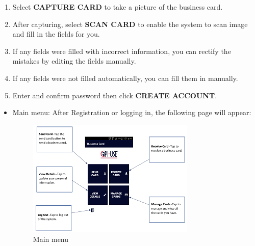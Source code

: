 \documentclass[english]{article}
\begin{document}
\begin{itemize}
\begin{enumerate}
			\item Select \textbf{CAPTURE CARD} to take a picture of the business card.
			\item After capturing, select \textbf{SCAN CARD} to enable the system to scan image and fill in the fields for you.
			\item If any fields were filled with incorrect information, you can rectify the mistakes by editing the fields manually.
			\item If any fields were not filled automatically, you can fill them in manually.
			\item Enter and confirm password then click \textbf{CREATE ACCOUNT}.
		\end{enumerate}
	\end{itemize}
	\begin{itemize}
		\item Main menu:
		\subitem After Registration or logging in, the following page will appear:
		
		\begin{figure}[H]
			\centering
			\includegraphics[scale=0.7]{Main_Menu.png}
			\caption{Main menu}
			\label{figure: 4}
		\end{figure}
	\end{itemize}
\end{document}
